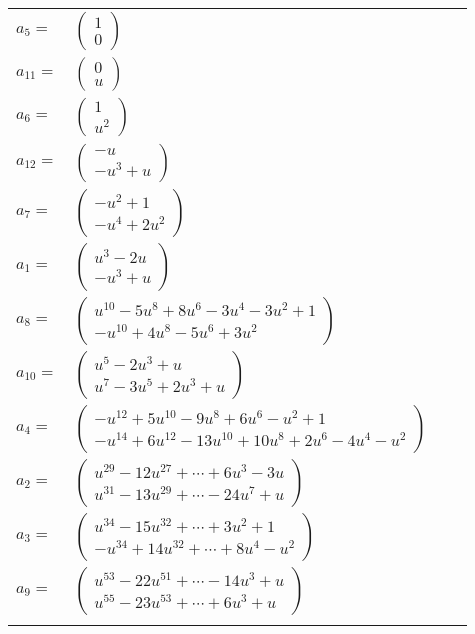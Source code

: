 \documentclass[1p]{elsarticle_modified}
\theoremstyle{definition}
\begin{document}
\begin{tabular}{m{7pt} m{180pt} m{7pt} m{180pt} }
\flushright $a_{5}=$&$\begin{pmatrix}1\\0\end{pmatrix}$ \\
\flushright $a_{11}=$&$\begin{pmatrix}0\\u\end{pmatrix}$ \\
\flushright $a_{6}=$&$\begin{pmatrix}1\\u^2\end{pmatrix}$ \\
\flushright $a_{12}=$&$\begin{pmatrix}- u\\- u^3+u\end{pmatrix}$ \\
\flushright $a_{7}=$&$\begin{pmatrix}- u^2+1\\- u^4+2 u^2\end{pmatrix}$ \\
\flushright $a_{1}=$&$\begin{pmatrix}u^3-2 u\\- u^3+u\end{pmatrix}$ \\
\flushright $a_{8}=$&$\begin{pmatrix}u^{10}-5 u^8+8 u^6-3 u^4-3 u^2+1\\- u^{10}+4 u^8-5 u^6+3 u^2\end{pmatrix}$ \\
\flushright $a_{10}=$&$\begin{pmatrix}u^5-2 u^3+u\\u^7-3 u^5+2 u^3+u\end{pmatrix}$ \\
\flushright $a_{4}=$&$\begin{pmatrix}- u^{12}+5 u^{10}-9 u^8+6 u^6- u^2+1\\- u^{14}+6 u^{12}-13 u^{10}+10 u^8+2 u^6-4 u^4- u^2\end{pmatrix}$ \\
\flushright $a_{2}=$&$\begin{pmatrix}u^{29}-12 u^{27}+\cdots+6 u^3-3 u\\u^{31}-13 u^{29}+\cdots-24 u^7+u\end{pmatrix}$ \\
\flushright $a_{3}=$&$\begin{pmatrix}u^{34}-15 u^{32}+\cdots+3 u^2+1\\- u^{34}+14 u^{32}+\cdots+8 u^4- u^2\end{pmatrix}$ \\
\flushright $a_{9}=$&$\begin{pmatrix}u^{53}-22 u^{51}+\cdots-14 u^3+u\\u^{55}-23 u^{53}+\cdots+6 u^3+u\end{pmatrix}$\\&\end{tabular}
\end{document}
